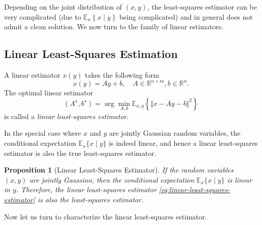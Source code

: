 \documentclass[
]{book}
\newtheorem{proposition}{Proposition}[chapter]
\theoremstyle{definition}
\theoremstyle{definition}
\theoremstyle{definition}
\theoremstyle{definition}
\theoremstyle{remark}
\begin{document}
Depending on the joint distribution of \((x,y)\), the least-squares estimator can be very complicated (due to \(\mathbb{E}_x\left\{ x \mid y\right\}\) being complicated) and in general does not admit a clean solution. We now turn to the family of linear estimators.

\hypertarget{linear-least-squares-estimation}{%
\subsection{Linear Least-Squares Estimation}\label{linear-least-squares-estimation}}

A linear estimator \(x(y)\) takes the following form
\[
x(y) = Ay + b, \quad A \in \mathbb{R}^{n \times m}, b \in \mathbb{R}^n.
\]
The optimal linear estimator
\begin{equation}
(A^\star, b^\star) = \arg\min_{A,b} \mathbb{E}_{x,y} \left\{ \Vert x - Ay - b \Vert^2 \right\}
\label{eq:linear-least-squares-estimator}
\end{equation}
is called a \emph{linear least-squares estimator}.

In the special case where \(x\) and \(y\) are jointly Gaussian random variables, the conditional expectation \(\mathbb{E}_{x} \{x \mid y \}\) is indeed linear, and hence a linear least-squares estimator is also the true least-squares estimator.

\begin{proposition}[Linear Least-Squares Estimator]
\protect\hypertarget{prp:linear-least-squares-estimator}{}\label{prp:linear-least-squares-estimator}If the random variables \((x,y)\) are jointly Gaussian, then the conditional expectation \(\mathbb{E}_x \{x \mid y \}\) is linear in \(y\). Therefore, the linear least-squares estimator \eqref{eq:linear-least-squares-estimator} is also the least-squares estimator.
\end{proposition}

Now let us turn to characterize the linear least-squares estimator.
\end{document}
